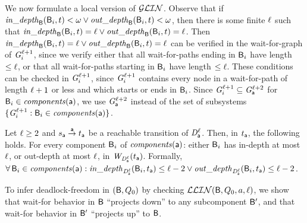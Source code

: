 We now formulate a local version of $\GLin$.
Observe that if
$\widepth{\B}{\B_i}{t} < \omega \lor \wodepth{\B}{\B_i}{t} < \omega$,
then there is some finite $\l$ such that 
$\widepth{\B}{\B_i}{t} = \l \lor \wodepth{\B}{\B_i}{t} = \l$.
Then $\widepth{\B}{\B_i}{t} = \l \lor \wodepth{\B}{\B_i}{t} = \l$ can be verified in 
the wait-for-graph of 
$\ssg{i}{\l+1}$, since we verify either that all wait-for-paths ending in $\B_i$
have length $\le \l$, or that 
all wait-for-paths starting in $\B_i$ 
have length $\le \l$.
These conditions can be checked in $\ssg{i}{\l+1}$, since $\ssg{i}{\l+1}$
contains every node in a
wait-for-path of length $\l+1$ or less and which starts or ends in $\B_i$.
%
Since $\ssg{i}{\l+1} \sub \ssg{\act}{\l+2}$ for $\B_i \in \cmps{\act}$, we use 
$\ssg{\act}{\l+2}$ instead of the set of subsystems 
$\set{\ssg{i}{\l+1} : \B_i \in \cmps{\act}}$. 




 \label{def:ldfc-k}
Let $\l \ge 2$ and $s_\act \goesto[\act] t_\act$ be a reachable transition of $\dsk{\act}{\l}$.
Then, in $t_\act$, the following holds. 
For every component $\B_i$ of $\cmps{\act}$:  
either $\B_i$ has in-depth at most $\l$, or out-depth at most $\l$, in $\wfg{\dsk{\act}{\l}}{t_\act}$. 
Formally,\\
\ind  $\fa \B_i \in \cmps{\act}: 
\widepth{\dsk{\act}{\l}}{\B_i}{t_\act} \le \l-2 \lor \wodepth{\dsk{\act}{\l}}{\B_i}{t_\act} \le \l-2$.
\ed


To infer deadlock-freedom in $(\B, Q_0)$ by checking $\LLin(\B, Q_0, a, \l)$,
 we show that wait-for behavior in $\B$ ``projects down''
to any subcomponent $\B'$, and that wait-for behavior in $\B'$ ``projects up'' to $\B$.


